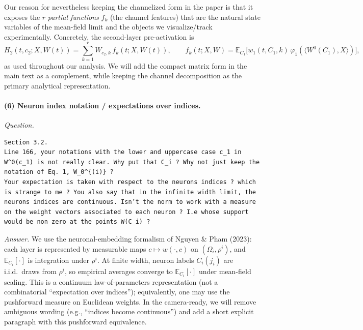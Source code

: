 \documentclass[11pt,a4paper]{article}
\newcommand{\NP}{Nguyen \& Pham (2023)}
\begin{document}
Our reason for nevertheless keeping the channelized form in the paper is that it exposes the $r$ \emph{partial functions} $f_k$ (the channel features) that are the natural state variables of the mean-field limit and the objects we visualize/track experimentally. Concretely, the second-layer pre-activation is
\[
H_2(t,c_2;X,W(t))=\sum_{k=1}^r W_{c_2,k}\,f_k(t;X,W(t)),
\qquad
f_k(t;X,W)=\mathbb{E}_{C_1}\big[w_1(t,C_1,k)\,\varphi_1(\langle W^0(C_1),X\rangle)\big],
\]
as used throughout our analysis. We will add the compact matrix form in the main text as a complement, while keeping the channel decomposition as the primary analytical representation.

\paragraph{(6) Neuron index notation / expectations over indices.}
\textit{Question.}\par
\begin{verbatim}
Section 3.2.
Line 166, your notations with the lower and uppercase case c_1 in W^0(c_1) is not really clear. Why put that C_i ? Why not just keep the notation of Eq. 1, W_0^{(i)} ?
Your expectation is taken with respect to the neurons indices ? which is strange to me ? You also say that in the infinite width limit, the neurons indices are continuous. Isn’t the norm to work with a measure on the weight vectors associated to each neuron ? I.e whose support would be non zero at the points W(C_i) ?
\end{verbatim}
\textit{Answer.} We use the neuronal-embedding formalism of \NP{}: each layer is represented by measurable maps $c\mapsto w(\cdot,c)$ on $(\Omega_i,\rho^i)$, and $\mathbb{E}_{C_i}[\cdot]$ is integration under $\rho^i$. At finite width, neuron labels $C_i(j_i)$ are i.i.d.\ draws from $\rho^i$, so empirical averages converge to $\mathbb{E}_{C_i}[\cdot]$ under mean-field scaling. This is a continuum law-of-parameters representation (not a combinatorial ``expectation over indices''); equivalently, one may use the pushforward measure on Euclidean weights. In the camera-ready, we will remove ambiguous wording (e.g., ``indices become continuous'') and add a short explicit paragraph with this pushforward equivalence.
\end{document}
